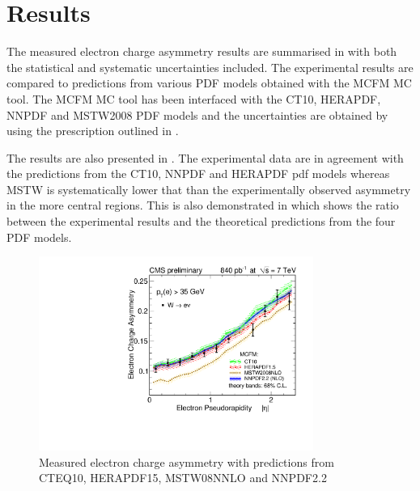 \section{Results}
The measured electron charge asymmetry results are summarised in
 with both the statistical and systematic
uncertainties included. The experimental results are compared to predictions
from various PDF models obtained with the MCFM\cite{campbellmcfm} MC tool.  The
MCFM MC tool has been interfaced with the CT10\cite{lai2010vv},
HERAPDF\cite{aaron2010combined}, NNPDF\cite{Lionetti:2011pw} and
MSTW2008\cite{martin2009parton} PDF models and  the uncertainties are obtained
by using the prescription outlined in .

The results are also presented in . The experimental
data are in agreement with the predictions from the CT10, NNPDF and HERAPDF pdf
models whereas MSTW is systematically lower that than the experimentally
observed asymmetry in the more central regions. This is also demonstrated in
 which shows the ratio between the experimental results
and the theoretical predictions from the four PDF models.

\begin{figure}[htbp]
  \begin{center}
\includegraphics*[width=0.80\textwidth]{updated_asym}
  \caption{\label{fig:updated_asym} Measured electron charge asymmetry with predictions from CTEQ10, HERAPDF15, MSTW08NNLO and NNPDF2.2}
  \end{center}
\end{figure}

